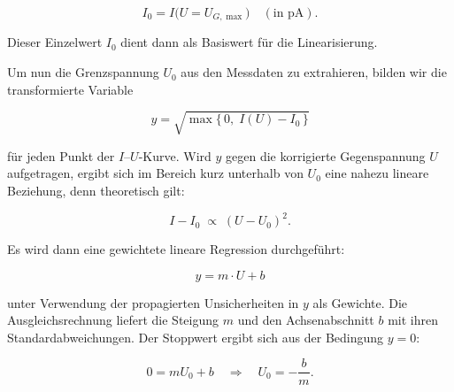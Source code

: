 \begin{equation}
  I_{0} = I\bigl(U = U_{G,\max}\bigr)\quad(\text{in pA}).
\end{equation}

Dieser Einzelwert $I_{0}$ dient dann als Basiswert für die Linearisierung.

Um nun die Grenzspannung $U_{0}$ aus den Messdaten zu extrahieren, bilden wir die transformierte Variable

\begin{equation}
  y = \sqrt{\max\{\,0,\;I(U) - I_{0}\,\}}
\end{equation}

für jeden Punkt der $I$–$U$-Kurve. Wird $y$ gegen die korrigierte Gegenspannung $U$ aufgetragen, ergibt sich im Bereich kurz unterhalb von $U_{0}$ eine nahezu lineare Beziehung, denn theoretisch gilt:

\begin{equation}
  I - I_{0} \;\propto\;(U - U_{0})^{2}.
\end{equation}

Es wird dann eine gewichtete lineare Regression durchgeführt:

\begin{equation}
    y = m \cdot U + b
\end{equation}

unter Verwendung der propagierten Unsicherheiten in $y$ als Gewichte. Die Ausgleichsrechnung liefert die Steigung $m$ und den Achsenabschnitt $b$ mit ihren Standardabweichungen. Der Stoppwert ergibt sich aus der Bedingung $y=0$:

\begin{equation}
  0 = m U_{0} + b
  \quad\Longrightarrow\quad
  U_{0} = -\frac{b}{m}.
\end{equation}

